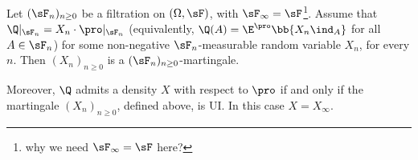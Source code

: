 \begin{lemma}\label{lem:martingale_density_ui_discrete}
Let $(\sF_n)_{n \geq 0}$ be a filtration on $(\Omega,\sF)$, with $\sF_\infty = \sF$\footnote{why we need $\sF_\infty = \sF$ here?}. Assume that $\Q|_{\sF_n} = X_n \cdot \pro|_{\sF_n}$ (equivalently, $\Q(A) = \E^\pro\bb{X_n \ind_A}$ for all $A\in \sF_n$) for some non-negative $\sF_n$-measurable random variable $X_n$, for every $n$. Then $(X_n)_{n \geq 0}$ is a $(\sF_n)_{n\geq 0}$-martingale.


Moreover, $\Q$ admits a density $X$ with respect to $\pro$ if and only if the martingale $(X_n)_{n \geq 0}$, defined above, is UI. In this case $X = X_\infty$.
\end{lemma}
